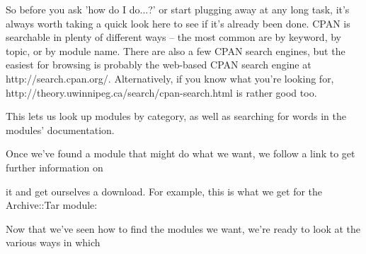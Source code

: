 \documentclass[a4paper,11pt]{book}
\begin{document}
\noindent 

\noindent So before you ask 'how do I do...?' or start plugging away at any long task, it's always worth taking a quick look here to see if it's already been done. CPAN is searchable in plenty of different ways -- the most common are by keyword, by topic, or by module name. There are also a few CPAN search engines, but the easiest for browsing is probably the web-based CPAN search engine at http://search.cpan.org/. Alternatively, if you know what you're looking for, http://theory.uwinnipeg.ca/search/cpan-search.html is rather good too.

\noindent 

\noindent 

\noindent This lets us look up modules by category, as well as searching for words in the modules' documentation.

\noindent Once we've found a module that might do what we want, we follow a link to get further information on

\noindent it and get ourselves a download. For example, this is what we get for the Archive::Tar module:

\noindent 

\noindent 

\noindent 

\noindent 

\noindent 

\noindent 

\noindent 

\noindent 

\noindent 

\noindent 

\noindent 

\noindent 

\noindent 

\noindent 

\noindent 

\noindent 

\noindent 

\noindent 

\noindent 

\noindent 

\noindent 

\noindent 

\noindent 

\noindent 

\noindent 

\noindent 

\noindent 

\noindent Now that we've seen how to find the modules we want, we're ready to look at the various ways in which
\end{document}
